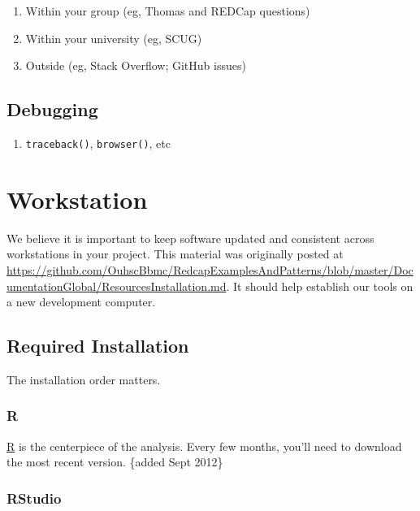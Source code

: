 \documentclass[
]{book}
\providecommand{\tightlist}{%
  \setlength{\itemsep}{0pt}\setlength{\parskip}{0pt}}
\begin{document}
\begin{enumerate}
\def\labelenumi{\arabic{enumi}.}
\tightlist
\item
  Within your group (eg, Thomas and REDCap questions)
\item
  Within your university (eg, SCUG)
\item
  Outside (eg, Stack Overflow; GitHub issues)
\end{enumerate}

\hypertarget{debugging}{%
\section{Debugging}\label{debugging}}

\begin{enumerate}
\def\labelenumi{\arabic{enumi}.}
\tightlist
\item
  \texttt{traceback()}, \texttt{browser()}, etc
\end{enumerate}

\hypertarget{workstation}{%
\chapter{Workstation}\label{workstation}}

We believe it is important to keep software updated and consistent across workstations in your project. This material was originally posted at \url{https://github.com/OuhscBbmc/RedcapExamplesAndPatterns/blob/master/DocumentationGlobal/ResourcesInstallation.md}. It should help establish our tools on a new development computer.

\hypertarget{workstation-required}{%
\section{Required Installation}\label{workstation-required}}

The installation order matters.

\hypertarget{workstation-r}{%
\subsection{R}\label{workstation-r}}

\href{http://cran.r-project.org/}{R} is the centerpiece of the analysis. Every few months, you'll need to download the most recent version. \{added Sept 2012\}

\hypertarget{workstation-rstudio}{%
\subsection{RStudio}\label{workstation-rstudio}}
\end{document}
